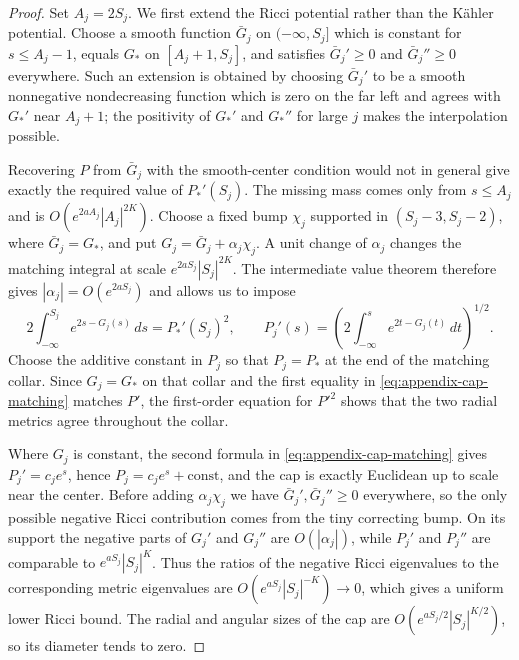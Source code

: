 \documentclass[11pt]{amsart}
\theoremstyle{definition}
\theoremstyle{remark}
\begin{document}
\begin{proof}
Set $A_j=2S_j$.  We first extend the Ricci potential rather than the K\"ahler potential.  Choose a smooth function $\bar G_j$ on $(-\infty,S_j]$ which is constant for $s\leq A_j-1$, equals $G_*$ on $[A_j+1,S_j]$, and satisfies $\bar G_j'\geq0$ and $\bar G_j''\geq0$ everywhere.  Such an extension is obtained by choosing $\bar G_j'$ to be a smooth nonnegative nondecreasing function which is zero on the far left and agrees with $G_*'$ near $A_j+1$; the positivity of $G_*'$ and $G_*''$ for large $j$ makes the interpolation possible.

Recovering $P$ from $\bar G_j$ with the smooth-center condition would not in general give exactly the required value of $P_*'(S_j)$.  The missing mass comes only from $s\leq A_j$ and is $O(e^{2aA_j}|A_j|^{2K})$.  Choose a fixed bump $\chi_j$ supported in $(S_j-3,S_j-2)$, where $\bar G_j=G_*$, and put $G_j=\bar G_j+\alpha_j\chi_j$.  A unit change of $\alpha_j$ changes the matching integral at scale $e^{2aS_j}|S_j|^{2K}$.  The intermediate value theorem therefore gives $|\alpha_j|=O(e^{2aS_j})$ and allows us to impose
\begin{equation}\label{eq:appendix-cap-matching}
2\int_{-\infty}^{S_j}e^{2s-G_j(s)}\,ds=P_*'(S_j)^2,
\qquad
P_j'(s)=\left(2\int_{-\infty}^{s}e^{2t-G_j(t)}\,dt\right)^{1/2}.
\end{equation}
Choose the additive constant in $P_j$ so that $P_j=P_*$ at the end of the matching collar.  Since $G_j=G_*$ on that collar and the first equality in \eqref{eq:appendix-cap-matching} matches $P'$, the first-order equation for $P'^2$ shows that the two radial metrics agree throughout the collar.

Where $G_j$ is constant, the second formula in \eqref{eq:appendix-cap-matching} gives $P_j'=c_je^s$, hence $P_j=c_je^s+\mathrm{const}$, and the cap is exactly Euclidean up to scale near the center.  Before adding $\alpha_j\chi_j$ we have $\bar G_j',\bar G_j''\geq0$ everywhere, so the only possible negative Ricci contribution comes from the tiny correcting bump.  On its support the negative parts of $G_j'$ and $G_j''$ are $O(|\alpha_j|)$, while $P_j'$ and $P_j''$ are comparable to $e^{aS_j}|S_j|^K$.  Thus the ratios of the negative Ricci eigenvalues to the corresponding metric eigenvalues are $O(e^{aS_j}|S_j|^{-K})\to0$, which gives a uniform lower Ricci bound.  The radial and angular sizes of the cap are $O(e^{aS_j/2}|S_j|^{K/2})$, so its diameter tends to zero.
\end{proof}
\end{document}
